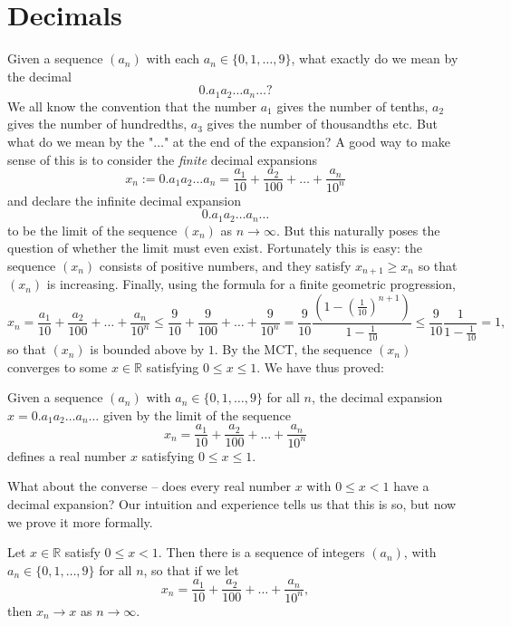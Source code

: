 \documentclass[11pt,dvipsnames]{book}
\def\R{\mathbb{R}}
\numberwithin{equation}{section} %
\numberwithin{figure}{section} %
\numberwithin{table}{section} %
\begin{document}
\section{Decimals}
Given a sequence $(a_n)$ with each $a_n \in \{0, 1, \dots , 9\}$, what exactly do we mean by the decimal 
\[ 0.a_1 a_2 \dots a_n \dots?\]
We all know the convention that the number $a_1$ gives the number of tenths, $a_2$ gives the number of hundredths, 
$a_3$ gives the number of thousandths etc. But what do we mean by the "$\dots$" at the end of the expansion? A good way to make sense of this is to consider the {\em finite} decimal expansions
\[ x_n := 0.a_1 a_2 \dots a_n = \frac{a_1}{10} + \frac{a_2}{100} + \dots + \frac{a_n}{10^n}\] 
and declare the infinite decimal expansion
\[ 0.a_1 a_2 \dots a_n \dots\]
to be the limit of the sequence $(x_n)$ as $n \to \infty$. But this naturally poses the question of whether the limit must even exist. Fortunately this is easy: the sequence
$(x_n)$ consists of positive numbers, and they satisfy $x_{n+1} \geq x_n$ so that $(x_n)$ is increasing. Finally, using the formula for a finite geometric progression, 
\[ x_n = \frac{a_1}{10} + \frac{a_2}{100} + \dots + \frac{a_n}{10^n} \leq \frac{9}{10} + \frac{9}{100} + \dots + \frac{9}{10^n} =  \frac{9}{10}\frac{(1 - (\frac{1}{10})^{n+1})}{1 - \frac{1}{10}} \leq \frac{9}{10}\frac{1}{1 - \frac{1}{10}}=1,\]
so that $(x_n)$ is bounded above by $1$. By the MCT, the sequence $(x_n)$ converges to some $x \in \R$ satisfying $0 \leq x \leq 1$.
We have thus proved:
\begin{theorem}
Given a sequence $(a_n)$ with $a_n \in \{0,1, \dots ,9\}$ for all $n$, the decimal expansion $ x= 0.a_1 a_2 \dots a_n \dots$ given by the limit of the sequence  
\[ x_n = \frac{a_1}{10} + \frac{a_2}{100} + \dots + \frac{a_n}{10^n} \]
defines a real number $x$ satisfying $0 \leq x \leq 1$.
\end{theorem}
What about the converse -- does every real number $x$ with $0 \leq x <1$ have a decimal expansion? Our intuition and experience tells us that this is so, but now we prove it more formally.

\begin{theorem}\label{decimal_existence}
Let $x\in\mathbb{R}$ satisfy $0 \leq x <1$. Then there is a sequence of integers $(a_n)$, with $a_{n}\in \{0,1,\dots,9\}$ for all $n$, so that if we let
\[ x_n = \frac{a_1}{10} + \frac{a_2}{100} + \dots + \frac{a_n}{10^n},\]
then $x_n \to x$ as $n \to \infty$.
\end{theorem}
\end{document}
